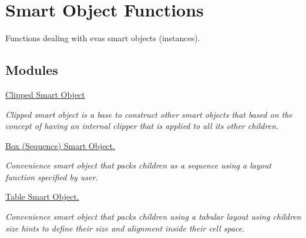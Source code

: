 \section{Smart Object Functions}
\label{group__Evas__Smart__Object__Group}


Functions dealing with evas smart objects (instances).  


\subsection*{Modules}
\begin{DoxyCompactItemize}
\item 
\hyperlink{group__Evas__Smart__Object__Clipped}{Clipped Smart Object}


\begin{DoxyCompactList}\small\item\em Clipped smart object is a base to construct other smart objects that based on the concept of having an internal clipper that is applied to all its other children. \item\end{DoxyCompactList}

\item 
\hyperlink{group__Evas__Object__Box}{Box (Sequence) Smart Object.}


\begin{DoxyCompactList}\small\item\em Convenience smart object that packs children as a sequence using a layout function specified by user. \item\end{DoxyCompactList}

\item 
\hyperlink{group__Evas__Object__Table}{Table Smart Object.}


\begin{DoxyCompactList}\small\item\em Convenience smart object that packs children using a tabular layout using children size hints to define their size and alignment inside their cell space. \item\end{DoxyCompactList}

\end{DoxyCompactItemize}
